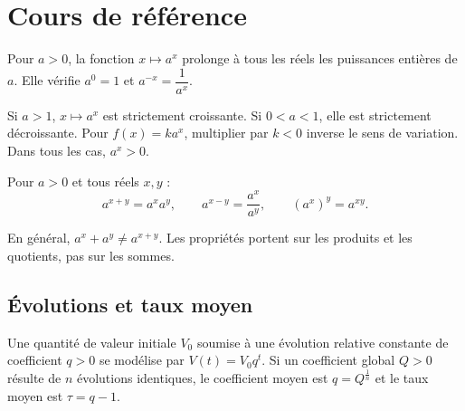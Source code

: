
\section{Cours de référence}
Pour $a>0$, la fonction $x\mapsto a^x$ prolonge à tous les réels les puissances entières de $a$. Elle vérifie $a^0=1$ et $a^{-x}=\dfrac{1}{a^x}$.

\begin{center}
\end{center}

\begin{keypoint}
Si $a>1$, $x\mapsto a^x$ est strictement croissante. Si $0<a<1$, elle est strictement décroissante. Pour $f(x)=ka^x$, multiplier par $k<0$ inverse le sens de variation. Dans tous les cas, $a^x>0$.
\end{keypoint}

Pour $a>0$ et tous réels $x,y$ :
\[
a^{x+y}=a^xa^y,\qquad a^{x-y}=\frac{a^x}{a^y},\qquad (a^x)^y=a^{xy}.
\]

\begin{pitfall}
En général, $a^x+a^y\neq a^{x+y}$. Les propriétés portent sur les produits et les quotients, pas sur les sommes.
\end{pitfall}

\subsection{Évolutions et taux moyen}
Une quantité de valeur initiale $V_0$ soumise à une évolution relative constante de coefficient $q>0$ se modélise par $V(t)=V_0q^t$. Si un coefficient global $Q>0$ résulte de $n$ évolutions identiques, le coefficient moyen est $q=Q^{\frac1n}$ et le taux moyen est $\tau=q-1$.

